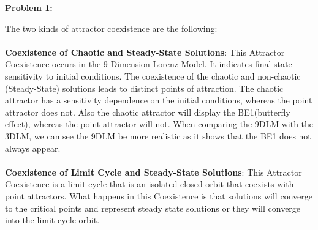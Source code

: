 \documentclass[11pt]{article}
\newcommand{\skipline}{\vspace{\baselineskip}}
\newenvironment{problem}[1]{\textbf{Problem #1: }}{\newpage}
\begin{document}
\begin{problem}{1}
\begin{enumerate}[label = (\alph*)]
		 	\skipline
		 	The two kinds of attractor coexistence are the following:
		 	\\ \\
		 	\textbf{Coexistence of Chaotic and Steady-State Solutions}:  This Attractor Coexistence occurs in the 9 Dimension Lorenz Model. It indicates final state sensitivity to initial conditions. The coexistence of the chaotic and non-chaotic (Steady-State) solutions leads to distinct points of attraction. The chaotic attractor has a sensitivity dependence on the initial conditions, whereas the point attractor does not.  Also the chaotic attractor will display the BE1(butterfly effect), whereas the point attractor will not. When comparing the 9DLM with the 3DLM, we can see the 9DLM be more realistic as it shows that the BE1 does not always appear. 
		 	\\ \\
		 	\textbf{Coexistence of Limit Cycle and Steady-State Solutions}:  This Attractor Coexistence is a limit cycle that is an isolated closed orbit that coexists with point attractors. What happens in this Coexistence is that solutions will converge to the critical points and represent steady state solutions or they will converge into the limit cycle orbit.  
		 \end{enumerate}
	\end{problem}
\end{document}
